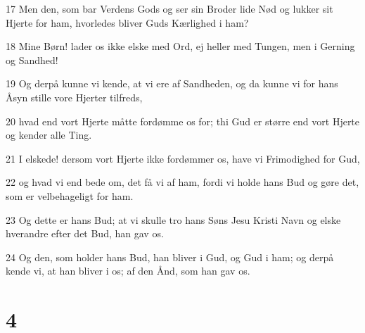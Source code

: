 \par 17 Men den, som bar Verdens Gods og ser sin Broder lide Nød og lukker sit Hjerte for ham, hvorledes bliver Guds Kærlighed i ham?
\par 18 Mine Børn! lader os ikke elske med Ord, ej heller med Tungen, men i Gerning og Sandhed!
\par 19 Og derpå kunne vi kende, at vi ere af Sandheden, og da kunne vi for hans Åsyn stille vore Hjerter tilfreds,
\par 20 hvad end vort Hjerte måtte fordømme os for; thi Gud er større end vort Hjerte og kender alle Ting.
\par 21 I elskede! dersom vort Hjerte ikke fordømmer os, have vi Frimodighed for Gud,
\par 22 og hvad vi end bede om, det få vi af ham, fordi vi holde hans Bud og gøre det, som er velbehageligt for ham.
\par 23 Og dette er hans Bud; at vi skulle tro hans Søns Jesu Kristi Navn og elske hverandre efter det Bud, han gav os.
\par 24 Og den, som holder hans Bud, han bliver i Gud, og Gud i ham; og derpå kende vi, at han bliver i os; af den Ånd, som han gav os.

\chapter{4}


